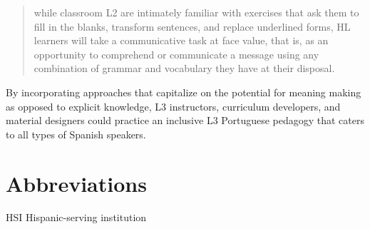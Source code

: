 \documentclass[output=paper]{../langscibook}
\begin{document}
\begin{quote}
while classroom L2 are intimately familiar with exercises that ask them to fill in the blanks, transform sentences, and replace underlined forms, HL learners will take a communicative task at face value, that is, as an opportunity to comprehend or communicate a message using any combination of grammar and vocabulary they have at their disposal. \citep[121]{Zyzik2016}
\end{quote}

By incorporating approaches that capitalize on the potential for meaning making as opposed to explicit knowledge, L3 instructors, curriculum developers, and material designers could practice an inclusive L3 Portuguese pedagogy that caters to all types of Spanish speakers.


\section*{Abbreviations}
HSI Hispanic-serving institution

{\sloppy\printbibliography[heading=subbibliography,notkeyword=this]}
\end{document}
